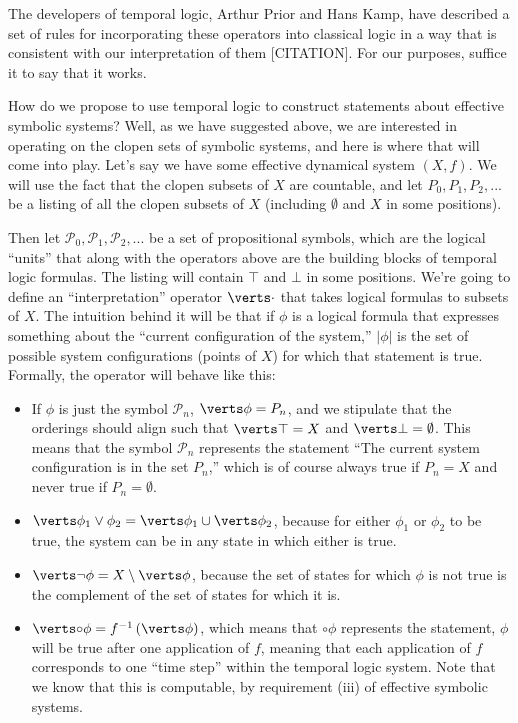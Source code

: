 \documentclass{fkpaper}
\newcommand{\lnext}{\circ}
\newcommand{\psc}{\mathcal{P}}
\begin{document}
\begin{multicols}{2}
The developers of temporal logic, Arthur Prior and Hans Kamp, have described a set of rules for incorporating these operators into classical logic in a way that is consistent with our interpretation of them [CITATION]. For our purposes, suffice it to say that it works.

How do we propose to use temporal logic to construct statements about effective symbolic systems? Well, as we have suggested above, we are interested in operating on the clopen sets of symbolic systems, and here is where that will come into play. Let's say we have some effective dynamical system $(X, f)$. We will use the fact that the clopen subsets of $X$ are countable, and let $P_0, P_1, P_2, ...$ be a listing of all the clopen subsets of $X$ (including $\emptyset$ and $X$ in some positions).

Then let $\psc_0, \psc_1, \psc_2, ...$ be a set of propositional symbols, which are the logical ``units'' that along with the operators above are the building blocks of temporal logic formulas. The listing will contain $\top$ and $\bot$ in some positions. We're going to define an ``interpretation'' operator $\abs{\cdot}$ that takes logical formulas to subsets of $X$. The intuition behind it will be that if $\phi$ is a logical formula that expresses something about the ``current configuration of the system,'' $|\phi|$ is the set of possible system configurations (points of $X$) for which that statement is true. Formally, the operator will behave like this:

\begin{itemize}
  \item If $\phi$ is just the symbol $\psc_n$, $\abs{\phi} = P_n$, and we stipulate that the orderings should align such that $\abs{\top} = X$ and $\abs{\bot} = \emptyset$. This means that the symbol $\psc_n$ represents the statement ``The current system configuration is in the set $P_n$,'' which is of course always true if $P_n = X$ and never true if $P_n = \emptyset$.

  \item $\abs{\phi_1 \lor \phi_2} = \abs{\phi_1} \cup \abs{\phi_2}$, because for either $\phi_1$ or $\phi_2$ to be true, the system can be in any state in which either is true.

  \item $\abs{\lnot \phi} = X \setminus \abs{\phi}$, because the set of states for which $\phi$ is not true is the complement of the set of states for which it is.

  \item $\abs{\lnext \phi} = f^{-1}\left( \abs{\phi} \right)$, which means that $\lnext \phi$ represents the statement, $\phi$ will be true after one application of $f$, meaning that each application of $f$ corresponds to one ``time step'' within the temporal logic system. Note that we know that this is computable, by requirement (iii) of effective symbolic systems.


\end{itemize}
\end{multicols}
\end{document}
